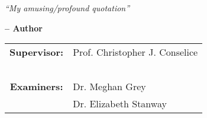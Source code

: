 %
%

\clearpage
\thispagestyle{empty}

\begin{center}


\emph{``My amusing/profound quotation''}
\begin{flushright}
{\bf -- Author }
\end{flushright}
\begin{flushright}
\begin{minipage}[c]{6cm}
\begin{tabular}{cl}
{\bf Supervisor:} & Prof. Christopher J. Conselice\\
~ & ~ \\
{\bf Examiners:} & Dr. Meghan Grey\\
~ & Dr. Elizabeth Stanway\\
\end{tabular}
\end{minipage}
\end{flushright}
\end{center}

\clearpage


